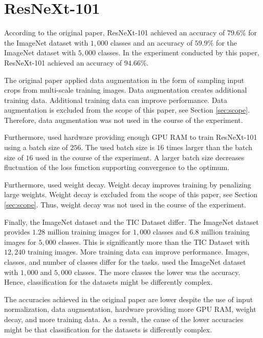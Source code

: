 \section{ResNeXt-101}
According to the original paper, ResNeXt-101 achieved an accuracy of $79.6 \%$ for the ImageNet dataset with $1{,}000$ classes and an accuracy of $59.9 \%$ for the ImageNet dataset with $5{,}000$ classes. \autocite{Xie.2017} In the experiment conducted by this paper, ResNeXt-101 achieved an accuracy of $94.66 \%$.
\par
The original paper applied data augmentation in the form of sampling input crops from multi-scale training images. \autocite{Xie.2017}
Data augmentation creates additional training data. Additional training data can improve performance. \autocite{ElAmir.2020} Data augmentation is excluded from the scope of this paper, see Section \ref{sec:scope}. Therefore, data augmentation was not used in the course of the experiment. 
\par
Furthermore, \cite{Xie.2017} used hardware providing enough GPU RAM to train ResNeXt-101 using a batch size of $256$. The used batch size is $16$ times larger than the batch size of $16$ used in the course of the experiment. A larger batch size decreases fluctuation of the loss function supporting convergence to the optimum. \autocite{Ruder.2016}
\par
Furthermore, \cite{Xie.2017} used weight decay. Weight decay improves training by penalizing large weights. \autocite{ElAmir.2020} Weight decay is excluded from the scope of this paper, see Section \ref{sec:scope}. Thus, weight decay was not used in the course of the experiment. 
\par
Finally, the ImageNet dataset and the \ac{TIC Dataset} differ. The ImageNet dataset provides $1.28$ million training images for $1{,}000$ classes and $6.8$ million training images for $5{,}000$ classes. This is significantly more than the \ac{TIC Dataset} with $12{,}240$ training images. \autocite{He.2016} More training data can improve performance. \autocite{ElAmir.2020} Images, classes, and number of classes differ for the tasks. \cite{Xie.2017} used the ImageNet dataset with $1{,}000$ and $5{,}000$ classes. The more classes the lower was the accuracy. Hence, classification for the datasets might be differently complex.
\par
The accuracies achieved in the original paper are lower despite the use of input normalization, data augmentation, hardware providing more GPU RAM, weight decay, and more training data. As a result, the cause of the lower accuracies might be that classification for the datasets is differently complex.


